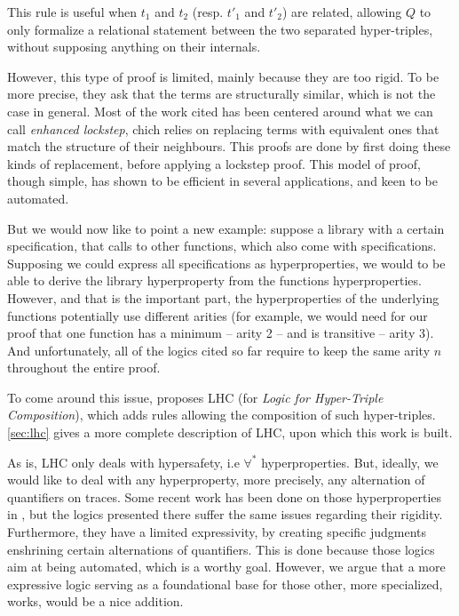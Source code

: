 This rule is useful when $t_1$ and $t_2$ (resp. $t'_1$ and $t'_2$) are related, allowing $Q$ to only formalize a relational statement between the two separated hyper-triples, without supposing anything on their internals.

However, this type of proof is limited, mainly because they are too rigid. To be more precise, they ask that the terms are structurally similar, which is not the case in general. Most of the work cited has been centered around what we can call \emph{enhanced lockstep}, chich relies on replacing terms with equivalent ones that match the structure of their neighbours. This proofs are done by first doing these kinds of replacement, before applying a lockstep proof. This model of proof, though simple, has shown to be efficient in several applications, and keen to be automated.

But we would now like to point a new example: suppose a library with a certain specification, that calls to other functions, which also come with specifications. Supposing we could express all specifications as hyperproperties, we would to be able to derive the library hyperproperty from the functions hyperproperties. However, and that is the important part, the hyperproperties of the underlying functions potentially use different arities (for example, we would need for our proof that one function has a minimum -- arity 2 -- and is transitive -- arity 3). And unfortunately, all of the logics cited so far require to keep the same arity $n$ throughout the entire proof.

To come around this issue, \citet{DOsualdo22} proposes LHC (for \emph{Logic for Hyper-Triple Composition}), which adds rules allowing the composition of such hyper-triples. \cref{sec:lhc} gives a more complete description of LHC, upon which this work is built.

As is, LHC only deals with hypersafety, i.e $\forall^*$ hyperproperties. But, ideally, we would like to deal with any hyperproperty, more precisely, any alternation of quantifiers on traces. Some recent work has been done on those hyperproperties in \cite{Dickerson22, Dardinier23, Beutner22}, but the logics presented there suffer the same issues regarding their rigidity. Furthermore, they have a limited expressivity, by creating specific judgments enshrining certain alternations of quantifiers. This is done because those logics aim at being automated, which is a worthy goal. However, we argue that a more expressive logic serving as a foundational base for those other, more specialized, works, would be a nice addition.

